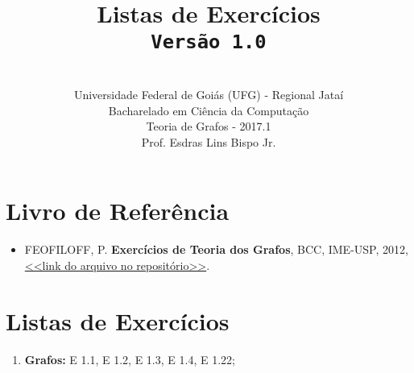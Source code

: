 \documentclass[12pt,a4paper,oneside]{article}
\author{\\Universidade Federal de Goiás (UFG) - Regional Jataí\\Bacharelado em Ciência da Computação \\Teoria de Grafos - 2017.1 \\Prof. Esdras Lins Bispo Jr.}
\date{}
\title{
	\sc \huge Listas de Exercícios 
	\\{\tt Versão 1.0}
}
\begin{document}
\maketitle

\section{Livro de Referência}
	\begin{itemize}
		\item FEOFILOFF, P. {\bf Exercícios de Teoria dos Grafos}, BCC, IME-USP, 2012, \href{https://github.com/bispojr/grafos/raw/master/2017.1/arquivos/exercicios-grafos.pdf}{<<link do arquivo no repositório>>}.
	\end{itemize}
	
\section{Listas de Exercícios}

\begin{enumerate}

	\item[] {\bf Grafos:} E 1.1, E 1.2, E 1.3, E 1.4, E 1.22;

\end{enumerate}
\end{document}
